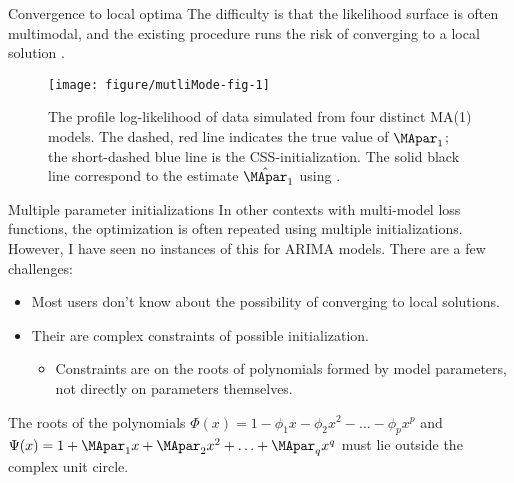 \documentclass[aspectratio=169]{beamer}\usepackage[]{graphicx}\usepackage[]{xcolor}
\makeatletter
\def\maxwidth{ %
  \ifdim\Gin@nat@width>\linewidth
    \linewidth
  \else
    \Gin@nat@width
  \fi
}
\newenvironment{knitrout}{}{} %
\makeatother
\begin{document}
\begin{frame}{Convergence to local optima}
  The difficulty is that the likelihood surface is often multimodal, and the existing procedure runs the risk of converging to a local solution \citep{ripley2002}.


  

\begin{figure}[ht]
\begin{knitrout}
\color{fgcolor}
\texttt{[image: figure/mutliMode-fig-1]} 
\end{knitrout}
\caption{\label{fig:multiMode}The profile log-likelihood of data simulated from four distinct MA(1) models. The dashed, red line indicates the true value of $\MApar_1$; the short-dashed blue line is the CSS-initialization. The solid black line correspond to the estimate $\hat{\MApar}_1$ using .}
\end{figure}

\end{frame}

\begin{frame}{Multiple parameter initializations}
  In other contexts with multi-model loss functions, the optimization is often repeated using multiple initializations. 
  However, I have seen \alert{no instances} of this for ARIMA models. There are a few challenges: 
  \begin{itemize}
    \item Most users don't know about the possibility of converging to local solutions. 
    \item Their are complex constraints of possible initialization. 
    \begin{itemize}
      \item Constraints are on the roots of polynomials formed by model parameters, not directly on parameters themselves.
    \end{itemize}
  \end{itemize}
  \pause
  The roots of the polynomials $\Phi(x) = 1 - \phi_1 x - \phi_2x^2 - \ldots - \phi_px^p$ and $\Psi(x) = 1 + \MApar_1 x + \MApar_2x^2 + \ldots + \MApar_qx^q$ must lie outside the complex unit circle.
\end{frame}
\end{document}
